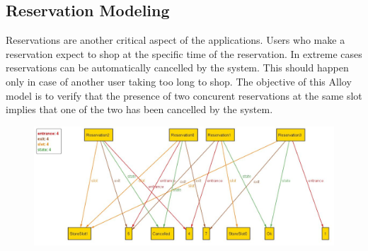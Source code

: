\subsection{Reservation Modeling}
Reservations are another critical aspect of the applications.
Users who make a reservation expect to shop at the specific time of the reservation.
In extreme cases reservations can be automatically cancelled by the system.
This should happen only in case of another user taking too long to shop.
The objective of this Alloy model is to verify that the presence of two concurent reservations at the same slot implies that one of the two has been cancelled by the system.

\begin{figure}[H]
    \centering
    \includegraphics[width=1\textwidth]{alloy/Reservation_Alloy.JPG}
\end{figure}
